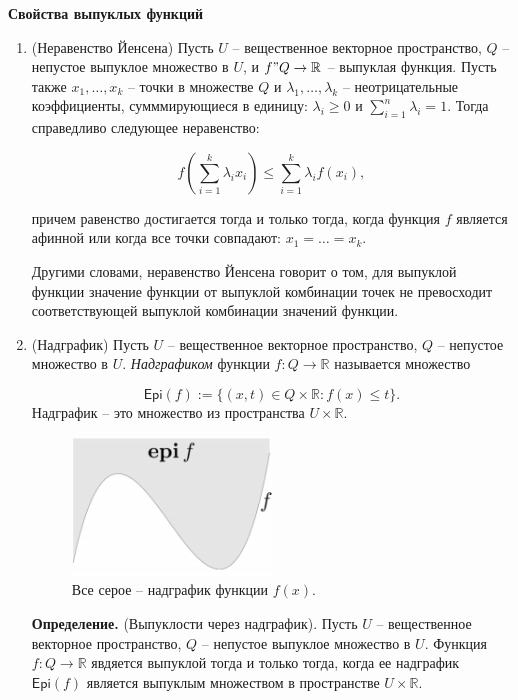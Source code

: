 \textbf{Свойства выпуклых функций}
\begin{enumerate}
    \item (Неравенство Йенсена) Пусть $U$ -- вещественное векторное пространство, $Q$ -- непустое выпуклое множество в $U$, и $f " Q \to \mathbb{R}$ -- выпуклая функция. Пусть также $x_1,\ldots, x_k$ -- точки в множестве $Q$ и $\lambda_1,\ldots, \lambda_k$ -- неотрицательные коэффициенты, сумммирующиеся в единицу: $\lambda_i \geq 0$ и $\sum_{i = 1}^n \lambda_i = 1.$ Тогда справедливо следующее неравенство:

    $$f\left(\sum\limits_{i= 1}^k \lambda_i x_i\right) \leq \sum_{i = 1}^k \lambda_i f(x_i),$$

    причем равенство достигается тогда и только тогда, когда функция $f$ является афинной или когда все точки совпадают: $x_1 = \ldots = x_k.$

    Другими словами, неравенство Йенсена говорит о том, для выпуклой функции значение функции от выпуклой комбинации точек не превосходит соответствующей выпуклой комбинации значений функции.

    \item(Надграфик) Пусть $U$ -- вещественное векторное пространство, $Q$ -- непустое множество в $U$. \textit{Надграфиком} функции $f : Q \to \mathbb{R}$ называется множество

    $$\mathsf{Epi}(f) := \{(x, t)\in Q \times \mathbb{R}: f(x) \leq t\}. $$
    Надграфик -- это множество из пространства $U \times \mathbb{R}.$

    \begin{figure}[H]
        \centering
        \includegraphics[width=0.5\textwidth]{images/epi.png}
        \caption{Все серое -- надграфик функции $f(x)$.}
    \end{figure}

    \textbf{Определение.} (Выпуклости через надграфик). Пусть $U$ -- вещественное векторное пространство, $Q$ -- непустое выпуклое множество в $U$. Функция $f : Q \to \mathbb{R}$ явдяется выпуклой тогда и только тогда, когда ее надграфик $\mathsf{Epi}(f)$ является выпуклым множеством в пространстве $U\times \mathbb{R}.$
    \bigskip


\end{enumerate}
